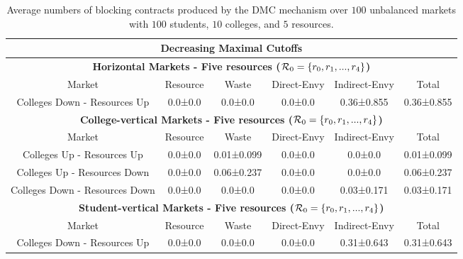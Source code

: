 \begin{table}[ht]
\centering
\small{
\caption{Average numbers of blocking contracts produced by the DMC mechanism over $100$ unbalanced markets with $100$ students, $10$ colleges, and $5$ resources.}
\begin{tabular}{cccccc}
\toprule
\multicolumn{6}{c}{\textbf{Decreasing Maximal Cutoffs}}\\
\toprule
\multicolumn{6}{c}{\textbf{Horizontal Markets - Five resources ($\operatorname{{\color{black}\mathcal{R}}}_0 = \{r_0,r_1,...,r_4\}$)}}\\
\toprule
Market & Resource   & Waste   & Direct-Envy   & Indirect-Envy       & Total    \\
\hline
Colleges Down - Resources Up & 0.0±0.0     & 0.0±0.0        & 0.0±0.0       & 0.36±0.855     & 0.36±0.855     \\
\toprule
\multicolumn{6}{c}{\textbf{College-vertical Markets - Five resources ($\operatorname{{\color{black}\mathcal{R}}}_0 = \{r_0,r_1,...,r_4\}$)}}\\
\toprule
Market & Resource   & Waste   & Direct-Envy   & Indirect-Envy       & Total    \\
\hline
Colleges Up - Resources Up & 0.0±0.0     & 0.01±0.099     & 0.0±0.0        & 0.0±0.0   & 0.01±0.099     \\
\hline
Colleges Up - Resources Down & 0.0±0.0     & 0.06±0.237     & 0.0±0.0       & 0.0±0.0   & 0.06±0.237     \\
\hline
Colleges Down - Resources Down & 0.0±0.0     & 0.0±0.0        & 0.0±0.0        & 0.03±0.171   & 0.03±0.171     \\
\toprule
\multicolumn{6}{c}{\textbf{Student-vertical Markets - Five resources ($\operatorname{{\color{black}\mathcal{R}}}_0 = \{r_0,r_1,...,r_4\}$)}}\\
\toprule
Market & Resource   & Waste   & Direct-Envy   & Indirect-Envy       & Total    \\
\hline
Colleges Down - Resources Up & 0.0±0.0     & 0.0±0.0        & 0.0±0.0        & 0.31±0.643     & 0.31±0.643      \\
\toprule
\end{tabular}
\label{tab:blocking_contracts_DMC_five_resources_unbalanced_markets}
}
\end{table}


